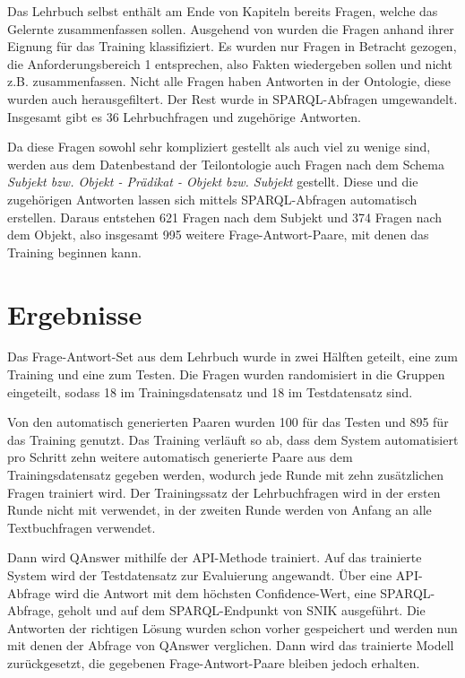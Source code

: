 \documentclass[utf8,biblatex]{lni}
\begin{document}
Das Lehrbuch selbst \cite{bb} enthält am Ende von Kapiteln bereits Fragen, welche das Gelernte zusammenfassen sollen.
Ausgehend von \cite{arneba} wurden die Fragen anhand ihrer Eignung für das Training klassifiziert.
Es wurden nur Fragen in Betracht gezogen, die Anforderungsbereich 1 entsprechen, also Fakten wiedergeben sollen und nicht z.B. zusammenfassen.
Nicht alle Fragen haben Antworten in der Ontologie, diese wurden auch herausgefiltert.
Der Rest wurde in SPARQL-Abfragen umgewandelt.
Insgesamt gibt es 36 Lehrbuchfragen und zugehörige Antworten.

Da diese Fragen sowohl sehr kompliziert gestellt als auch viel zu wenige sind, werden aus dem Datenbestand der Teilontologie auch Fragen nach dem Schema \emph{Subjekt bzw. Objekt - Prädikat - Objekt bzw. Subjekt} gestellt.
Diese und die zugehörigen Antworten lassen sich mittels SPARQL-Abfragen automatisch erstellen.
Daraus entstehen 621 Fragen nach dem Subjekt und 374 Fragen nach dem Objekt, also insgesamt 995 weitere Frage-Antwort-Paare, mit denen das Training beginnen kann.
\section{Ergebnisse}

Das Frage-Antwort-Set aus dem Lehrbuch wurde in zwei Hälften geteilt, eine zum Training und eine zum Testen.
Die Fragen wurden randomisiert in die Gruppen eingeteilt, sodass 18 im Trainingsdatensatz und 18 im Testdatensatz sind.

Von den automatisch generierten Paaren wurden 100 für das Testen und 895 für das Training genutzt.
Das Training verläuft so ab, dass dem System automatisiert pro Schritt zehn weitere automatisch generierte Paare aus dem Trainingsdatensatz gegeben werden,
wodurch jede Runde mit zehn zusätzlichen Fragen trainiert wird.
Der Trainingssatz der Lehrbuchfragen wird in der ersten Runde nicht mit verwendet,
in der zweiten Runde werden von Anfang an alle Textbuchfragen verwendet.

Dann wird QAnswer mithilfe der API-Methode trainiert.
Auf das trainierte System wird der Testdatensatz zur Evaluierung angewandt.
Über eine API-Abfrage wird die Antwort mit dem höchsten Confidence-Wert, eine SPARQL-Abfrage, geholt und auf dem SPARQL-Endpunkt von SNIK ausgeführt.
Die Antworten der richtigen Lösung wurden schon vorher gespeichert und werden nun mit denen der Abfrage von QAnswer verglichen.
Dann wird das trainierte Modell zurückgesetzt, die gegebenen Frage-Antwort-Paare bleiben jedoch erhalten.
\end{document}
